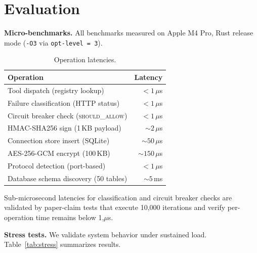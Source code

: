 \documentclass[10pt, twocolumn]{article}
\begin{document}
\section{Evaluation}
\label{sec:evaluation}

\textbf{Micro-benchmarks.} All benchmarks measured on Apple M4 Pro, Rust release mode (\texttt{-O3} via \texttt{opt-level = 3}).

\begin{table}[h]
\caption{Operation latencies.}
\label{tab:perf}
\centering
\scriptsize
\begin{tabular}{@{}lr@{}}
\toprule
\textbf{Operation} & \textbf{Latency} \\
\midrule
Tool dispatch (registry lookup) & $< 1\,\mu$s \\
Failure classification (HTTP status) & $< 1\,\mu$s \\
Circuit breaker check (\textsc{should\_allow}) & $< 1\,\mu$s \\
HMAC-SHA256 sign (1\,KB payload) & $\sim 2\,\mu$s \\
Connection store insert (SQLite) & $\sim 50\,\mu$s \\
AES-256-GCM encrypt (100\,KB) & $\sim 150\,\mu$s \\
Protocol detection (port-based) & $< 1\,\mu$s \\
Database schema discovery (50 tables) & $\sim 5\,$ms \\
\bottomrule
\end{tabular}
\end{table}

Sub-microsecond latencies for classification and circuit breaker checks are validated by paper-claim tests that execute 10{,}000 iterations and verify per-operation time remains below 1{,}$\mu$s.

\textbf{Stress tests.} We validate system behavior under sustained load. Table~\ref{tab:stress} summarizes results.
\end{document}
